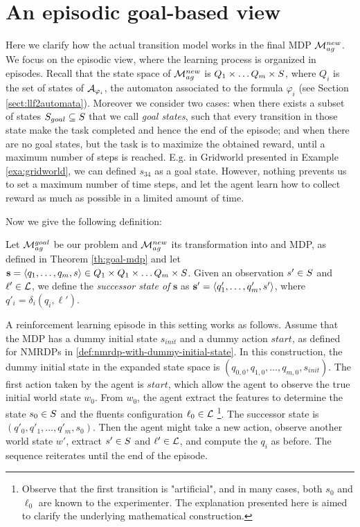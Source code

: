 \section{An episodic goal-based view}\label{sect:episodic-view}
Here we clarify how the actual transition model works in the final MDP $\mathcal{M}_{ag}^{new}$. We focus on the episodic view, where the learning process is organized in episodes.
Recall that the state space of $\mathcal{M}_{ag}^{new}$ is $Q_1\times \dots Q_m \times S$, where $Q_i$ is the set of states of $\mathcal{A}_{\varphi_i}$, the automaton associated to the \LLf formula $\varphi_i$ (see Section \ref{sect:llf2automata}). 
Moreover we consider two cases: when there exists a subset of states $S_{goal} \subseteq S$ that we call \emph{goal states}, such that every transition in those state make the task completed and hence the end of the episode; and when there are no goal states, but the task is to maximize the obtained reward, until a maximum number of steps is reached. E.g. in Gridworld presented in Example \ref{exa:gridworld}, we can defined $s_{34}$ as a goal state. However, nothing prevents us to set a maximum number of time steps, and let the agent learn how to collect reward as much as possible in a limited amount of time.

Now we give the following definition:
\begin{definition}
	Let $\mathcal{M}_{ag}^{goal}$ be our problem and $\mathcal{M}_{ag}^{new}$ its transformation into and MDP, as defined in Theorem \ref{th:goal-mdp} and let $\mathbf{s}=\langle q_1, \dots, q_m, s \rangle\in Q_1\times Q_1\times \dots Q_m \times S$. Given an observation $s'\in S$ and $\ell'\in\mathcal{L}$, we define the \emph{successor state of} $\mathbf{s}$ as $\mathbf{s'}=\langle q'_1, \dots, q'_m, s' \rangle$, where $q'_i = \delta_i(q_i, \ell')$.
\end{definition}
	
A reinforcement learning episode in this setting works as follows. Assume that the MDP has a dummy initial state $s_{init}$ and a dummy action $start$, as defined for NMRDPs in \ref{def:nmrdp-with-dummy-initial-state}. In this construction, the dummy initial state in the expanded state space is $(q_{0,0}, q_{1,0}, \dots, q_{m, 0}, s_{init})$. 
The first action taken by the agent is $start$, which allow the agent to observe the true initial world state $w_0$. 
From $w_0$, the agent extract the features to determine the state $s_0\in S$ and the fluents configuration $\ell_0\in \mathcal{L}$
\footnote{Observe that the first transition is "artificial", and in many cases, both $s_0$ and $\ell_0$ are known to the experimenter. The explanation presented here is aimed to clarify the underlying mathematical construction.}. The successor state is $(q'_{0}, q'_{1}, \dots, q'_{m}, s_0)$. Then the agent might take a new action, observe another world state $w'$, extract $s'\in S$ and $\ell'\in\mathcal{L}$, and compute the $q_i$ as before. The sequence reiterates until the end of the episode.

